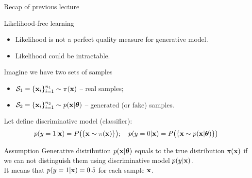 


\begin{frame}
\titlepage
\end{frame}
\begin{frame}{Recap of previous lecture}
	\begin{block}{Likelihood-free learning}
		\begin{itemize}
			\item Likelihood is not a perfect quality measure for generative model.
			\item Likelihood could be intractable.
		\end{itemize}
	\end{block}
	Imagine we have two sets of samples 
	\begin{itemize}
		\item $\mathcal{S}_1 = \{\mathbf{x}_i\}_{i=1}^{n_1} \sim \pi(\mathbf{x})$ -- real samples;
		\item $\mathcal{S}_2 = \{\mathbf{x}_i\}_{i=1}^{n_2} \sim p(\mathbf{x} | \boldsymbol{\theta})$ -- generated (or fake) samples.
	\end{itemize}
	Let define discriminative model (classifier):
	\[
		p(y = 1 | \mathbf{x}) = P\bigl(\{\mathbf{x} \sim \pi(\mathbf{x})\}\bigr); \quad p(y = 0 | \mathbf{x}) = P\bigl(\{\mathbf{x} \sim p(\mathbf{x} | \boldsymbol{\theta})\}\bigr)
	\]
	\vspace{-0.5cm}
	\begin{block}{Assumption}
		Generative distribution $p(\mathbf{x} | \boldsymbol{\theta})$ equals to the true distribution $\pi(\mathbf{x})$ if we can not distinguish them using discriminative model $p(y | \mathbf{x})$. \\
		It means that $p(y = 1 | \mathbf{x}) = 0.5$ for each sample $\mathbf{x}$.
	\end{block}
\end{frame}
